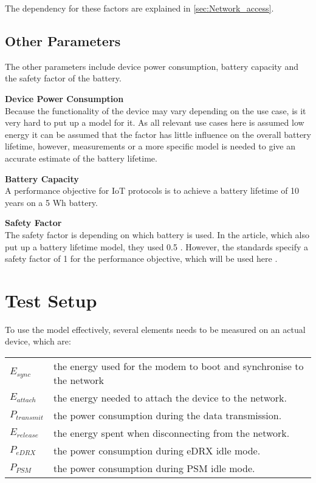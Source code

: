 The dependency for these factors are explained in \autoref{sec:Network_access}.



\subsection{Other Parameters}
The other parameters include device power consumption, battery capacity and the safety factor of the battery.

\textbf{Device Power Consumption}\\
Because the functionality of the device may vary depending on the use case, is it very hard to put up a model for it. As all relevant use cases here is assumed low energy it can be assumed that the factor has little influence on the overall battery lifetime, however, measurements or a more specific model is needed to give an accurate estimate of the battery lifetime.

\textbf{Battery Capacity}\\
A performance objective for IoT protocols is to achieve a battery lifetime of 10 years on a 5 Wh battery. 

\textbf{Safety Factor}\\
The safety factor is depending on which battery is used. In the article, which also put up a battery lifetime model, they used 0.5 \citep{Power_article}. However, the standards specify a safety factor of 1 for the performance objective, which will be used here \citep[Sec. 5.4]{safty_factor_standard}.


\section{Test Setup}
To use the model effectively, several elements needs to be measured on an actual device, which are:

\begin{tabular}{ll}
$E_{sync}$ & the energy used for the modem to boot and synchronise to the network \\
$E_{attach}$ & the energy needed to attach the device to the network. \\
$P_{transmit}$ & the power consumption during the data transmission. \\
$E_{release}$ & the energy spent when disconnecting from the network. \\
$P_{eDRX}$ & the power consumption during \gls{eDRX} idle mode. \\
$P_{PSM}$ & the power consumption during \gls{PSM} idle mode. \\
\end{tabular}

